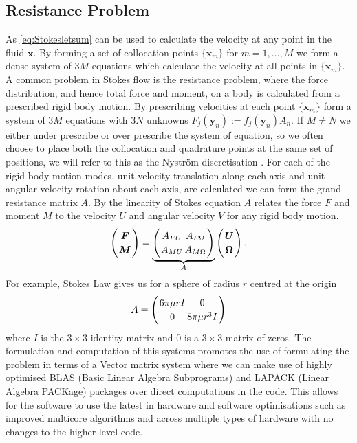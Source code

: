 \subsection{Resistance Problem}
As \cref{eq:Stokesletsum} can be used to calculate the velocity at any point in the fluid $\bm{x}$. By forming a set of collocation points $\{\bm{x}_m\}$ for $m=1,...,M$ we form a dense system of $3M$ equations which calculate the velocity at all points in $\{\bm{x}_m\}$. 
A common problem in Stokes flow is the resistance problem, where the force distribution, and hence total force and moment, on a body is calculated from a prescribed rigid body motion. By prescribing velocities at each point $\{\bm{x}_m\}$ form a system of $3M$ equations with $3N$ unknowns $F_j(\bm{y}_n) := f_j(\bm{y}_n)A_n$. If $M \neq N$ we either under prescribe or over prescribe the system of equation, so we often choose to place both the collocation and quadrature points at the same set of positions, we will  refer to this as the Nyström discretisation \cite{Nystrom1930UberRandwertaufgaben}. For each of the rigid body motion modes, unit velocity translation along each axis and unit angular velocity rotation about each axis, are calculated we can form the grand resistance matrix $A$\cite{Pozrikidis1992BoundaryFlow}. By the linearity of Stokes equation $A$ relates the force $F$ and moment $M$ to the velocity $U$ and angular velocity $V$ for any rigid body motion. 
\begin{equation*}
\arraycolsep=1pt\def\arraystretch{1.2}
\left(
\begin{array}{c}
\boldsymbol{F} \\
\boldsymbol{M}
\end{array}\right)=\underbrace{\left(\begin{array}{cc}
A_{F U} & A_{F \Omega} \\
A_{M U} & A_{M \Omega}
\end{array}\right)}_{A}\left(\begin{array}{c}
\boldsymbol{U} \\
\boldsymbol{\Omega}
\end{array}\right) .
\end{equation*}
 For example, Stokes Law gives us for a sphere of radius $r$ centred at the origin
 \begin{equation*}
\arraycolsep=1pt\def\arraystretch{1.2}
A=\left(\begin{array}{cc}
6\pi\mu r I & 0 \\
0 & 8\pi\mu r^3 I
\end{array}\right)
\end{equation*}
where $I$ is the $3\times 3$ identity matrix and $0$ is a $3\times 3$ matrix of zeros. The formulation and computation of this systems promotes the use of formulating the problem in terms of a Vector matrix system where we can make use of highly optimised BLAS (Basic Linear Algebra Subprograms) and LAPACK (Linear Algebra PACKage) packages over direct computations in the code. This allows for the software to use the latest in hardware and software optimisations such as improved multicore algorithms and across multiple types of hardware with no changes to the higher-level code.

